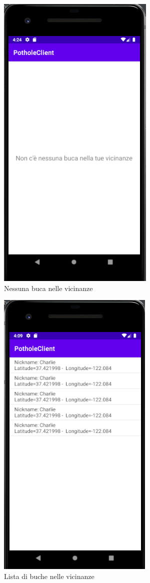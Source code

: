 \documentclass[a4paper,11pt]{report}
\begin{document}
\begin{figure} [H]
\centering
\includegraphics[scale = 0.65]{empty_potholes_list}
\caption{Nessuna buca nelle vicinanze}
\end{figure}


\begin{figure} [H]
\centering
\includegraphics[scale = 0.67]{potholes_list}
\caption{Lista di buche nelle vicinanze}
\end{figure}
\newpage
\end{document}

